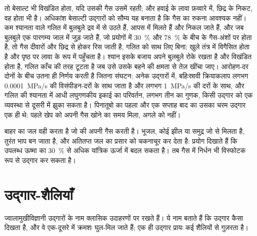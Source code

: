 तो बेसाल्ट भी विखंडित होता, यदि उसकी गैस उसमें रहती; और हवाई के लावा
फ़व्वारे में, छिद्र के निकट, वह होता भी है। अधिकांश बेसाल्टी उद्गारों को सौम्य यह बनाता है कि
गैस का रुकना आवश्यक नहीं। कम श्यानता वाले गलित में बुलबुले
द्रव में से उठते हैं, आपस में मिलते हैं और निकल जाते हैं, और जब बुलबुले एक पारगम्य जाल में जुड़ जाते हैं,
जो प्रयोगों में \qty{30}{\percent} और \qty{78}{\percent} के बीच के गैस-अंशों पर होता है,
तो गैस दीवारों और छिद्र से होकर रिस जाती है, गलित को साथ लिए
बिना:  खुले तंत्र में विगैसित होता है और पृष्ठ पर लावा के रूप में
पहुँचता है। श्यान  इसके बजाय अपने बुलबुले रोके रखता है और विखंडित होता है, गलित
काँच की तरह टूटता है जब उसे उसके बहने की क्षमता से तेज़ खींचा जाए। आरोहण-दर
दोनों के बीच उतना ही निर्णय करती है जितना संघटन: अनेक उद्गारों में, बहिःस्रावी क्रियाकलाप
लगभग \qty{0.0001}{MPa/s} की विसंपीडन-दरों के साथ जाता है और 
लगभग \qty{1}{MPa/s} की दरों के साथ, और गलित की श्यानता में आधी
लघुगणकीय इकाई का परिवर्तन, लगभग तीन का गुणक, किसी उद्गार को एक व्यवस्था से
दूसरी में झुका सकता है। पिनातूबो का पहला  और एक सप्ताह बाद का उसका चरम उद्गार
एक ही  थे: पहले खेप को अपनी गैस खोने का समय मिला, अगले को नहीं।

बाहर का जल वही करता है जो  की अपनी गैस करती है। भूजल, कोई झील या
समुद्र जो  से मिलता है, तुरंत भाप बन जाता है, और अतितप्त
जल का प्रसार  को चकनाचूर कर देता है: प्रयोग दिखाते हैं कि उपलब्ध ऊष्मा का
\qty{30}{\percent} से अधिक यांत्रिक ऊर्जा में बदल सकता है। तब गैस में निर्धन  भी
विस्फोटक रूप से उद्गार कर सकता है।

\section{उद्गार-शैलियाँ}

ज्वालामुखीविज्ञानी उद्गारों के नाम क्लासिक उदाहरणों पर रखते हैं। ये नाम बताते हैं कि
उद्गार कैसा दिखता है, और वे एक-दूसरे में क्रमशः घुल-मिल जाते हैं; एक ही उद्गार प्रायः
कई शैलियों से गुज़रता है।


